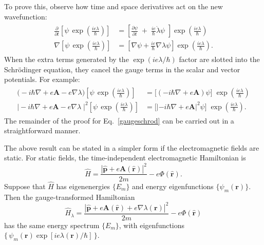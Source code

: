 \documentclass[pra,12pt]{revtex4}
\begin{document}
To prove this, observe how time and space derivatives act on the new
wavefunction:
\begin{align}
  \begin{aligned}
    \frac{\partial}{\partial t} \left[\psi \, \exp\left(\frac{ie\lambda}{\hbar}\right)\right] &=
    \left[\frac{\partial\psi}{\partial t} \;+\; \frac{ie}{\hbar} \dot{\lambda} \psi
      \,\, \right] \exp\left(\frac{ie\lambda}{\hbar}\right)\\
    \nabla \left[\psi \, \exp\left(\frac{ie\lambda}{\hbar}\right)\right] &=
    \left[\nabla \psi + \frac{ie}{\hbar} \nabla \lambda \psi \right] \exp\left(\frac{ie\lambda}{\hbar}\right).
  \end{aligned}
\end{align}
When the extra terms generated by the $\exp(ie\lambda/\hbar)$ factor
are slotted into the Schr\"odinger equation, they cancel the gauge
terms in the scalar and vector potentials.  For example:
\begin{align}
  \begin{aligned}
    \Big(-i\hbar\nabla + e\mathbf{A} - e\nabla\lambda\Big)
    \left[\psi \, \exp\left(\frac{ie\lambda}{\hbar}\right)\right] &=
    \Big[\left(-i\hbar\nabla + e\mathbf{A}\right)\psi\Big]\;
    \exp\left(\frac{ie\lambda}{\hbar}\right) \\
    \Big|-i\hbar\nabla + e\mathbf{A} - e\nabla\lambda\;\Big|^2
    \left[\psi \, \exp\left(\frac{ie\lambda}{\hbar}\right)\right] &=
    \Big[\left|-i\hbar\nabla + e\mathbf{A}\right|^2\psi\Big]\;
    \exp\left(\frac{ie\lambda}{\hbar}\right).
  \end{aligned}
\end{align}
The remainder of the proof for Eq.~\eqref{gaugeschrod} can be carried
out in a straightforward manner.


The above result can be stated in a simpler form if the
electromagnetic fields are static.  For static fields, the
time-independent electromagnetic Hamiltonian is
\begin{equation}
  \hat{H} = \frac{|\hat{\mathbf{p}}+e\mathbf{A}(\hat{\mathbf{r}})|^2}{2m}
  - e\Phi(\hat{\mathbf{r}}).
\end{equation}
Suppose that $\hat{H}$ has eigenenergies $\{E_m \}$ and energy
eigenfunctions $\{\psi_m(\mathbf{r})\}$.  Then the gauge-transformed
Hamiltonian
\begin{equation}
  \hat{H}_\lambda = \frac{|\hat{\mathbf{p}}+e\mathbf{A}(\hat{\mathbf{r}}) + e\nabla\lambda(\mathbf{r})|^2}{2m}
  - e\Phi(\hat{\mathbf{r}})
\end{equation}
has the same energy spectrum $\{E_m\}$, with eigenfunctions
$\{\,\psi_m(\mathbf{r}) \exp[ie\lambda(\mathbf{r})/\hbar]\,\}$.
\end{document}
